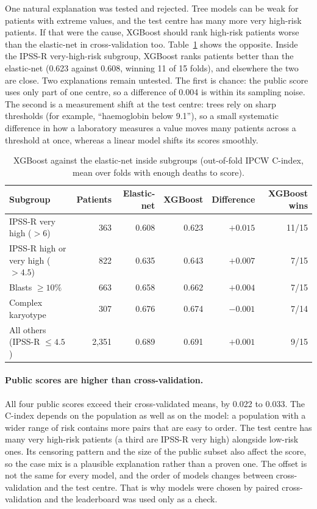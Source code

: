 \documentclass[11pt,a4paper]{article}
\begin{document}
One natural explanation was tested and rejected. Tree models can be weak for patients
with extreme values, and the test centre has many more very high-risk patients. If that
were the cause, XGBoost should rank high-risk patients worse than the elastic-net in
cross-validation too. Table~\ref{tab:subg} shows the opposite. Inside the IPSS-R
very-high-risk subgroup, XGBoost ranks patients better than the elastic-net (0.623 against
0.608, winning 11 of 15 folds), and elsewhere the two are close. Two explanations remain
untested. The first is chance: the public score uses only part of one centre, so a
difference of 0.004 is within its sampling noise. The second is a measurement shift at the
test centre: trees rely on sharp thresholds (for example, ``haemoglobin below 9.1''), so a
small systematic difference in how a laboratory measures a value moves many patients
across a threshold at once, whereas a linear model shifts its scores smoothly.

\begin{table}[H]
\centering
\caption{XGBoost against the elastic-net inside subgroups (out-of-fold IPCW C-index,
mean over folds with enough deaths to score).}
\label{tab:subg}
\small
\begin{tabular}{lrrrrr}
\toprule
Subgroup & Patients & Elastic-net & XGBoost & Difference & XGBoost wins \\
\midrule
IPSS-R very high ($>6$)          & 363   & 0.608 & 0.623 & $+0.015$ & 11/15 \\
IPSS-R high or very high ($>4.5$) & 822   & 0.635 & 0.643 & $+0.007$ & 7/15  \\
Blasts $\ge 10\%$                & 663   & 0.658 & 0.662 & $+0.004$ & 7/15  \\
Complex karyotype                & 307   & 0.676 & 0.674 & $-0.001$ & 7/14  \\
All others (IPSS-R $\le 4.5$)    & 2{,}351 & 0.689 & 0.691 & $+0.001$ & 9/15  \\
\bottomrule
\end{tabular}
\end{table}

\paragraph{Public scores are higher than cross-validation.} All four public scores exceed
their cross-validated means, by 0.022 to 0.033. The C-index depends on the population as
well as on the model: a population with a wider range of risk contains more pairs that are
easy to order. The test centre has many very high-risk patients (a third are IPSS-R very
high) alongside low-risk ones. Its censoring pattern and the size of the public subset
also affect the score, so the case mix is a plausible explanation rather than a proven one.
The offset is not the same for every model, and the order of models changes between
cross-validation and the test centre. That is why models were chosen by paired
cross-validation and the leaderboard was used only as a check.
\end{document}
